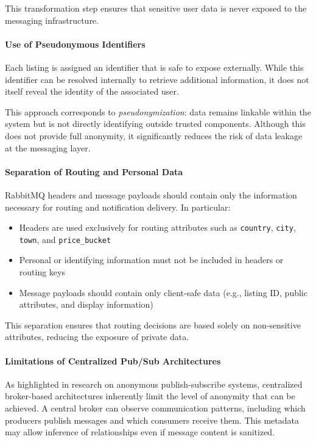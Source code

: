 This transformation step ensures that sensitive user data is never exposed to the messaging infrastructure.

\paragraph{Use of Pseudonymous Identifiers}

Each listing is assigned an identifier that is safe to expose externally. While this identifier can be resolved internally to retrieve additional information, it does not itself reveal the identity of the associated user.

This approach corresponds to \textit{pseudonymization}: data remains linkable within the system but is not directly identifying outside trusted components. Although this does not provide full anonymity, it significantly reduces the risk of data leakage at the messaging layer.

\paragraph{Separation of Routing and Personal Data}

RabbitMQ headers and message payloads should contain only the information necessary for routing and notification delivery. In particular:
\begin{itemize}
    \item Headers are used exclusively for routing attributes such as \texttt{country}, \texttt{city}, \texttt{town}, and \texttt{price\_bucket}
    \item Personal or identifying information must not be included in headers or routing keys
    \item Message payloads should contain only client-safe data (e.g., listing ID, public attributes, and display information)
\end{itemize}

This separation ensures that routing decisions are based solely on non-sensitive attributes, reducing the exposure of private data.

\paragraph{Limitations of Centralized Pub/Sub Architectures}

As highlighted in research on anonymous publish-subscribe systems, centralized broker-based architectures inherently limit the level of anonymity that can be achieved. A central broker can observe communication patterns, including which producers publish messages and which consumers receive them. This metadata may allow inference of relationships even if message content is sanitized.

